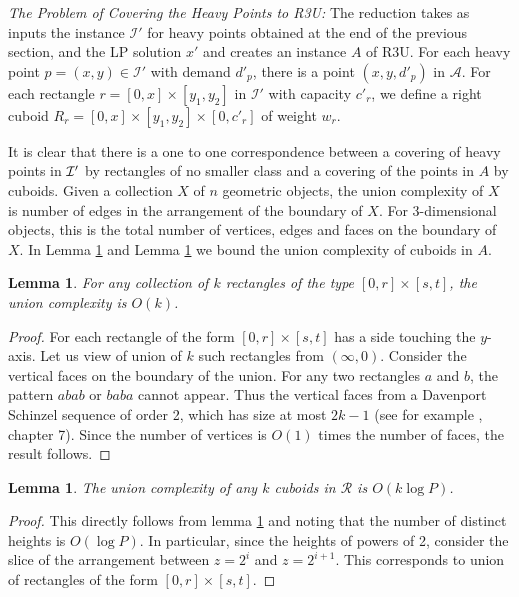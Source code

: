 \documentclass[11pt]{article}
\newtheorem{lemma}[thm]{Lemma}
\begin{document}
\medskip

{\em The Problem of 
Covering the Heavy Points to R3U:} 
The reduction takes as inputs 
the instance $\mathcal I'$ for heavy points obtained at the end of the previous section, and the LP solution $x'$ 
and creates an instance $A$ of R3U.
For each heavy point $p = (x, y) \in {\mathcal I'}$ with demand $d'_p$, 
there is a point $(x,y, d'_p)$ in $\mathcal A$.
For each rectangle $r = [0, x] \times [y_1, y_2]$ in $\mathcal I'$ with capacity $c'_r$, 
we define a right cuboid $R_r = [0,x]\times [y_1, y_2] \times [0,c'_r]$
of weight $w_r$.


\medskip
It is clear that there is a one to one correspondence between
a covering of heavy points in $\cal I'$ by rectangles of no smaller
class and a covering of the points in $A$ by cuboids. 
Given a collection $X$ of $n$ geometric objects, the union complexity of $X$ is
number of edges in the arrangement of the boundary of $X$. For 3-dimensional objects, this is the 
total number of vertices, edges and faces on the boundary of $X$. 
In Lemma \ref{2dunion} and Lemma \ref{3dunion}
we bound the union complexity of cuboids in $A$.

\begin{lemma}
\label{2dunion}
For any collection of $k$ rectangles of the type  $[0,r]\times [s,t]$, the union complexity  is $O(k)$.
\end{lemma}
\begin{proof}
For each rectangle of the form $[0,r]\times[s,t]$ has a side touching the $y$-axis. Let us view of union of $k$ such rectangles from $(\infty,0)$. Consider the vertical faces on the boundary of the union.
For any two rectangles $a$ and $b$, the pattern $abab$ or $baba$ cannot appear. Thus the vertical faces from a Davenport Schinzel sequence of order 2, which has size at most $2k-1$ (see for example \cite{Mat}, chapter 7). Since the number of vertices is $O(1)$ times the number of faces, the result follows. 
\end{proof}

\begin{lemma}
\label{3dunion}
The union complexity of any $k$ cuboids in $\mathcal{R}$ is $O(k \log P)$.
\end{lemma}
\begin{proof}
This directly follows from lemma \ref{2dunion} and noting that the number of distinct heights is $O(\log P)$. In particular, since the heights of powers of 2, consider the  slice of the arrangement between $z=2^{i}$ and $z=2^{i+1}$. This corresponds to union of rectangles of the form $[0,r]\times [s,t]$. 
\end{proof}
\end{document}
